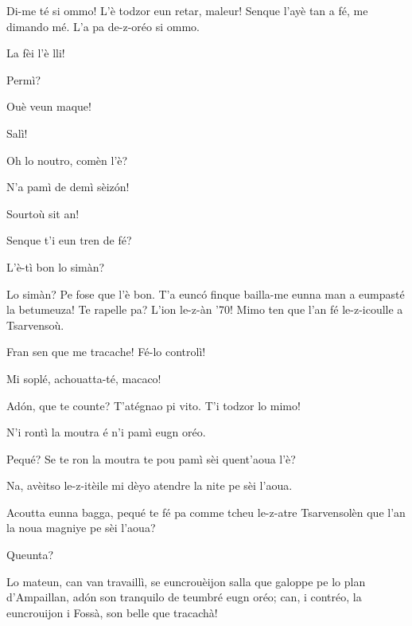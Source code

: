 \begin{drama}

\Vioupspeaks{} Di-me té si ommo! L'è todzor eun retar, maleur! Senque l'ayè tan a fé, me dimando mé. L'a pa de-z-oréo si ommo.

			
\Vioupspeaks La fèi l'è lli!			
			
\Vioujspeaks {} Permì?

\Vioupspeaks Ouè veun maque!

\Vioujspeaks Salì!


\Vioupspeaks Oh lo noutro, comèn l'è?

\Vioujspeaks N'a pamì de demì sèiz\'on!

\Vioupspeaks Sourtoù sit an!


\Vioupspeaks Senque t'i eun tren de fé?

\Vioujspeaks L’è-tì bon lo simàn?

\Vioupspeaks Lo simàn? Pe fose que l'è bon. T'a eunc\'o finque bailla-me eunna man a eumpasté la betumeuza! Te rapelle pa? L'ion le-z-àn '70! Mimo ten que l'an fé le-z-icoulle a Tsarvensoù.

\Vioujspeaks Fran sen que me tracache! Fé-lo controlì! 

\Vioupspeaks Mi soplé, achouatta-té, macaco!


\Vioupspeaks Ad\'on, que te counte? T'atégnao pi vito. T'i todzor lo mimo!

\Vioujspeaks N'i rontì la moutra é n'i pamì eugn oréo.

\Vioupspeaks Pequé? Se te ron la moutra te pou pamì sèi quent'aoua l'è?

\Vioujspeaks Na, avèitso le-z-itèile mi dèyo atendre la nite pe sèi l'aoua.

\Vioupspeaks Acoutta eunna bagga, pequé te fé pa comme tcheu le-z-atre Tsarvensolèn que l'an la noua magniye pe sèi l'aoua?

\Vioujspeaks Queunta?

\Vioupspeaks Lo mateun, can van travaillì, se euncrouèijon salla que galoppe pe lo plan d'Ampaillan, ad\'on son tranquilo de teumbré eugn oréo; can, i contréo, la euncrouijon i Fossà, son belle que tracachà!


\end{drama}
